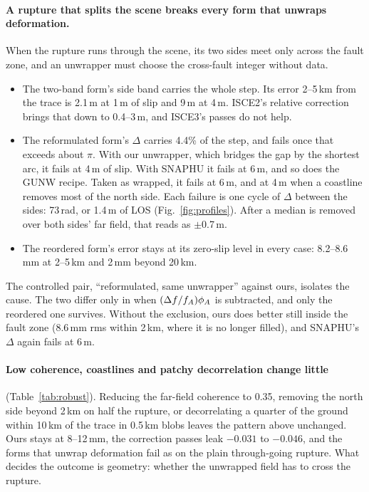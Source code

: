 \paragraph{A rupture that splits the scene breaks every form that unwraps deformation.} When the rupture runs through
the scene, its two sides meet only across the fault zone, and an unwrapper must choose the cross-fault integer
without data.
\begin{itemize}
  \item The two-band form's side band carries the whole step. Its error 2--5\,km from the trace is 2.1\,m at 1\,m of
        slip and 9\,m at 4\,m. ISCE2's relative correction brings that down to 0.4--3\,m, and ISCE3's passes do not
        help.
  \item The reformulated form's $\Delta$ carries 4.4\% of the step, and fails once that exceeds about $\pi$. With our
        unwrapper, which bridges the gap by the shortest arc, it fails at 4\,m of slip. With SNAPHU it fails at 6\,m,
        and so does the GUNW recipe. Taken as wrapped, it fails at 6\,m, and at 4\,m when a coastline removes most of
        the north side. Each failure is one cycle of $\Delta$ between the sides: 73\,rad, or 1.4\,m of LOS
        (Fig.~\ref{fig:profiles}). After a median is removed over both sides' far field, that reads as $\pm$0.7\,m.
  \item The reordered form's error stays at its zero-slip level in every case: 8.2--8.6\,mm at 2--5\,km and 2\,mm
        beyond 20\,km.
\end{itemize}
The controlled pair, ``reformulated, same unwrapper'' against ours, isolates the cause. The two differ only in when
$(\Delta f/f_A)\phi_A$ is subtracted, and only the reordered one survives. Without the exclusion, ours does better
still inside the fault zone (8.6\,mm rms within 2\,km, where it is no longer filled), and SNAPHU's $\Delta$ again
fails at 6\,m.

\paragraph{Low coherence, coastlines and patchy decorrelation change little} (Table~\ref{tab:robust}). Reducing the
far-field coherence to 0.35, removing the north side beyond 2\,km on half the rupture, or decorrelating a quarter of
the ground within 10\,km of the trace in 0.5\,km blobs leaves the pattern above unchanged. Ours stays at 8--12\,mm,
the correction passes leak $-0.031$ to $-0.046$, and the forms that unwrap deformation fail as on the plain
through-going rupture. What decides the outcome is geometry: whether the unwrapped field has to cross the rupture.

